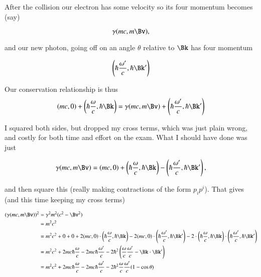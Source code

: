 After the collision our electron has some velocity so its four momentum becomes (say)

\begin{equation}\label{eqn:relativisticElectrodynamicsExamReflection:350}
\gamma (m c, m \Bv),
\end{equation}

and our new photon, going off on an angle $\theta$ relative to $\Bk$ has four momentum

\begin{equation}\label{eqn:relativisticElectrodynamicsExamReflection:370}
\left(\hbar \frac{\omega'}{c}, \hbar \Bk' \right)
\end{equation}

Our conservation relationship is thus
\begin{equation}\label{eqn:relativisticElectrodynamicsExamReflection:390}
(m c, 0) + \left(\hbar \frac{\omega}{c}, \hbar \Bk \right)
=
\gamma (m c, m \Bv)
+
\left(\hbar \frac{\omega'}{c}, \hbar \Bk' \right)
\end{equation}

I squared both sides, but dropped my cross terms, which was just plain wrong, and costly for both time and effort on the exam.  What I should have done was just

\begin{equation}\label{eqn:relativisticElectrodynamicsExamReflection:410}
\gamma (m c, m \Bv) =
(m c, 0) + \left(\hbar \frac{\omega}{c}, \hbar \Bk \right)
-\left(\hbar \frac{\omega'}{c}, \hbar \Bk' \right),
\end{equation}

and then square this (really making contractions of the form $p_i p^i$).  That gives (and this time keeping my cross terms)

\begin{align*}
(\gamma (m c, m \Bv) )^2 
&= \gamma^2 m^2 (c^2 - \Bv^2) \\
&= m^2 c^2 \\
&=
m^2 c^2 + 0 + 0
+ 2 (m c, 0) 
\cdot \left(\hbar \frac{\omega}{c}, \hbar \Bk \right)
- 2 (m c, 0) \cdot \left(\hbar \frac{\omega'}{c}, \hbar \Bk' \right)
- 2 
\cdot \left(\hbar \frac{\omega}{c}, \hbar \Bk \right)
\cdot \left(\hbar \frac{\omega'}{c}, \hbar \Bk' \right) \\
&=
m^2 c^2 + 2 m c \hbar \frac{\omega}{c} - 2 m c \hbar \frac{\omega'}{c}
- 2\hbar^2 \left(
\frac{\omega}{c} \frac{\omega'}{c}
- 
\Bk \cdot \Bk'
\right) \\
&=
m^2 c^2 + 2 m c \hbar \frac{\omega}{c} - 2 m c \hbar \frac{\omega'}{c}
- 2\hbar^2 
\frac{\omega}{c} \frac{\omega'}{c} (1 - \cos\theta)
\end{align*}

